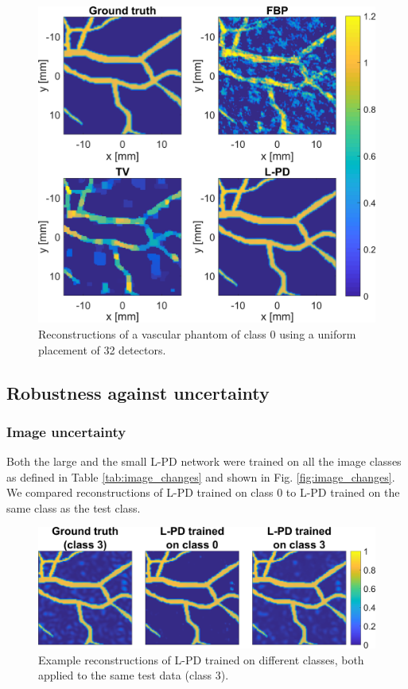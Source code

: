 \documentclass[journal]{IEEEtran}
\begin{document}
\begin{figure}[ht!]
\centering
\includegraphics[width=0.9\linewidth]{images/paper_plain_results.png}
\caption{Reconstructions of a vascular phantom of class 0 using a uniform placement of 32 detectors.}
\label{fig:plain_result}
\vspace{-3mm}
\end{figure}

\subsection{Robustness against uncertainty}\label{sec:results_robustness}
\subsubsection{Image uncertainty} Both the large and the small L-PD network were trained on all the image classes as defined in Table \ref{tab:image_changes} and shown in Fig. \ref{fig:image_changes}. We compared reconstructions of L-PD trained on class 0 to L-PD trained on the same class as the test class. 

\begin{figure}[ht!]
\centering
\includegraphics[width=0.95\linewidth]{images/image_changes_im.png}
\caption{Example reconstructions of L-PD trained on different classes, both applied to the same test data (class 3).}
\label{fig:image_changes_result}
\vspace{-3mm}
\end{figure}
\end{document}
